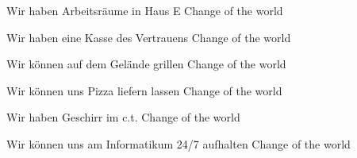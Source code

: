 \documentclass[avery5371,fronts,frame]{flashcards} %
\begin{document}
\begin{flashcard}{Wir haben Arbeitsräume in Haus E}
	Change of the world
\end{flashcard}
\begin{flashcard}{Wir haben eine Kasse des Vertrauens}
	Change of the world
\end{flashcard}
\begin{flashcard}{Wir können auf dem Gelände grillen}
	Change of the world
\end{flashcard}
\begin{flashcard}{Wir können uns Pizza liefern lassen}
	Change of the world
\end{flashcard}
\begin{flashcard}{Wir haben Geschirr im c.t.}
	Change of the world
\end{flashcard}
\begin{flashcard}{Wir können uns am Informatikum 24/7 aufhalten}
	Change of the world
\end{flashcard}
\end{document}
